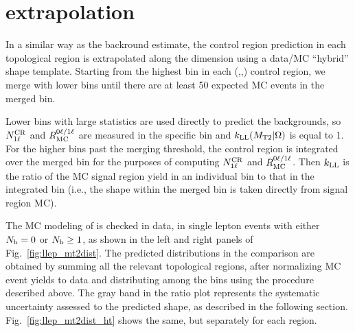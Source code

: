 \section{\texorpdfstring{\mttwo}{MT2} extrapolation}
\label{sec:llep_mt2}

In a similar way as the \znunu backround estimate, the control region prediction in each topological region is
extrapolated along the \mttwo dimension using a data/MC ``hybrid'' shape template.
Starting from the highest \mttwo bin in each (\Ht,\Nj,\Nb) control region, we merge with lower bins until
there are at least 50 expected MC events in the merged bin. 

Lower \mttwo bins with large statistics are used directly
to predict the backgrounds, so $N_{\mathrm{1\ell}}^{\mathrm{CR}}$ and $R_{\mathrm{MC}}^{0\ell/1\ell}$ are measured in the specific
\mttwo bin and $k_{\mathrm{LL}}(M_{\mathrm{T2}}|\Omega)$ is equal to 1.
For the higher \mttwo bins past the merging threshold, the control region is integrated over the merged bin
for the purposes of computing $N_{\mathrm{1\ell}}^{\mathrm{CR}}$ and $R_{\mathrm{MC}}^{0\ell/1\ell}$. Then $k_{\mathrm{LL}}$ is the 
ratio of the MC signal region yield in an individual \mttwo bin to that in the integrated bin (i.e., the \mttwo
shape within the merged bin is taken directly from signal region MC).

The MC modeling of \mttwo is checked in data, in single lepton events with either $N_{\mathrm{b}}=0$ or $N_{\mathrm{b}}\geq1$, as
shown in the left and right panels of Fig.~\ref{fig:llep_mt2dist}. The predicted distributions in the comparison
are obtained by summing all the relevant topological regions, after normalizing MC event yields to data
and distributing among the \mttwo bins using the procedure described above. The gray band in the ratio plot represents the
systematic uncertainty assessed to the predicted \mttwo shape, as described in the following section.
Fig.~\ref{fig:llep_mt2dist_ht} shows the same, but separately for each \Ht region.

